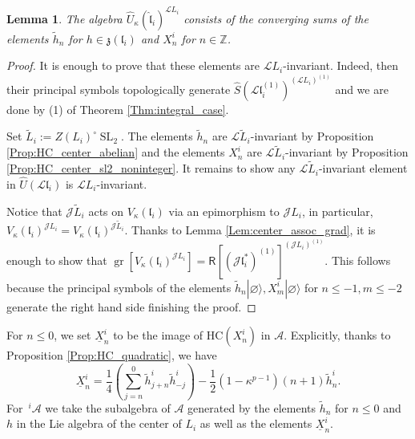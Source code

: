 \documentclass{amsart}
\newtheorem{Lem}[Thm]{Lemma}
\theoremstyle{definition}
\newcommand{\Ring}{\mathsf{R}}
\newcommand{\gr}{\operatorname{gr}}
\newcommand{\HC}{\mathrm{HC}} %
\newcommand{\Z}{\mathbb{Z}}
\newcommand{\lf}{\mathfrak{l}}
\newcommand{\A}{\mathscr{A}}
\newcommand{\Jet}{\mathscr{J}}
\newcommand{\Loop}{\mathscr{L}}
\numberwithin{equation}{section}
\begin{document}
{
\begin{Lem}\label{Lem:isogeny_Levi}
The algebra $\widehat{U}_\kappa(\hat{\lf}_i)^{\Loop L_i}$ consists of the converging sums of the elements $\tilde{h}_n$ for $h\in \mathfrak{z}(\mathfrak{l}_i)$ and $X^i_n$ for $n\in \Z$. 
\end{Lem}
\begin{proof}
It is enough to prove that these elements are $\Loop L_i$-invariant. Indeed, then their principal symbols topologically generate $\widehat{S}\left(\Loop \mathfrak{l}_i^{(1)}\right)^{(\Loop L_i)^{(1)}}$ and we are done by (1) of Theorem \ref{Thm:integral_case}.

Set $\tilde{L}_i:=Z(L_i)^\circ \operatorname{SL}_2$. The elements $\tilde{h}_n$
are $\Loop \tilde{L}_i$-invariant by Proposition \ref{Prop:HC_center_abelian} and the elements $X^i_n$ are $\Loop \tilde{L}_i$-invariant by Proposition \ref{Prop:HC_center_sl2_noninteger}. It remains to show any $\Loop \tilde{L}_i$-invariant element in $\widehat{U}(\Loop\mathfrak{l}_i)$ is $\Loop L_i$-invariant.

Notice that $\Jet\tilde{L}_i$ acts on $V_\kappa(\mathfrak{l}_i)$ via an epimorphism to $\Jet L_i$, in particular, $V_\kappa(\mathfrak{l}_i)^{\Jet L_i}=V_\kappa(\mathfrak{l}_i)^{\Jet \tilde{L}_i}$.
Thanks to Lemma \ref{Lem:center_assoc_grad}, it is enough to show that $\gr [V_\kappa(\mathfrak{l}_i)^{\Jet L_i}]=\Ring[(\Jet \mathfrak{l}_i^*)^{(1)}]^{(\Jet L_i)^{(1)}}$. This follows because the principal symbols of the elements $\tilde{h}_n|\varnothing\rangle, X^i_m|\varnothing\rangle$ for $n\leqslant -1,m\leqslant -2$ generate the right hand side finishing the proof.
\end{proof}
}

For $n\leqslant 0$, we set $\underline{X}^i_n$ to be the image of $\HC(X^i_n)$ in $\A$. Explicitly, thanks to Proposition 
\ref{Prop:HC_quadratic}, we have 
\begin{equation}\label{eq:underline_X_in}
\underline{X}^i_n=\frac{1}{4}\left(\sum_{j=n}^0\tilde{h}^i_{j+n}\tilde{h}^i_{-j}\right)-\frac{1}{2}(1-\kappa^{p-1})(n+1)\tilde{h}^i_{n}.
\end{equation}
For $\,^i\!\A$ we take the subalgebra of $\A$ generated by the elements $\tilde{h}_n$ for $n\leqslant 0$ and $h$ in the Lie algebra of the center of $L_i$ as well as the elements $\underline{X}^i_n$. 
\end{document}
